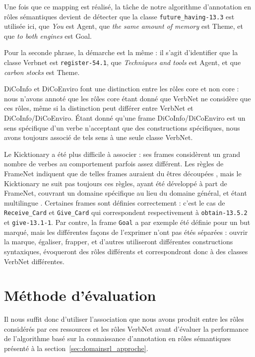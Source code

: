 Une fois que ce mapping est réalisé, la tâche de notre algorithme d'annotation
en rôles sémantiques devient de détecter que la classe \texttt{future\_having-13.3} est
utilisée ici, que \emph{You} est Agent, que \emph{the same amount of memory} est Theme,
et que \emph{to both engines} est Goal.

Pour la seconde phrase, la démarche est la même : il s'agit d'identifier que la
classe Verbnet est \texttt{register-54.1}, que \textit{Techniques and tools}
est Agent, et que \textit{carbon stocks} est Theme.

DiCoInfo et DiCoEnviro font une distinction entre les rôles core et non core :
nous n'avons annoté que les rôles core étant donné que VerbNet ne considère que
ces rôles, même si la distinction peut différer entre VerbNet et
DiCoInfo/DiCoEnviro. Étant donné qu'une frame DiCoInfo/DiCoEnviro est un sens
spécifique d'un verbe n'acceptant que des constructions spécifiques, nous avons
toujours associé de tels sens à une seule classe VerbNet.

Le Kicktionary a été plus difficile à associer : ses frames considèrent un
grand nombre de verbes au comportement parfois assez différent. Les règles de
FrameNet indiquent que de telles frames auraient du êtres découpées
\citep{ruppenhofer2006extended}, mais le Kicktionary ne suit pas toujours ces
règles, ayant été développé à part de FrameNet, couvrant un domaine spécifique
au lieu du domaine général, et étant multilingue
\citep{schmidt2006interfacing}. Certaines frames sont définies correctement :
c'est le cas de \texttt{Receive\_Card} et \texttt{Give\_Card} qui correspondent
respectivement à \texttt{obtain-13.5.2} et \texttt{give-13.1-1}. Par contre, la
frame \texttt{Goal} a par exemple été définie pour un but marqué, mais les
différentes façons de l'exprimer n'ont pas étés séparées : ouvrir la marque,
égaliser, frapper, et d'autres utiliseront différentes constructions
syntaxiques, évoqueront des rôles différents et correspondront donc à des
classes VerbNet différentes.

\section{Méthode d'évaluation}

Il nous suffit donc d'utiliser l'association que nous avons produit entre les
rôles considérés par ces ressources et les rôles VerbNet avant d'évaluer la
performance de l'algorithme basé sur la connaissance d'annotation en rôles
sémantiques présenté à la section~\ref{sec:domainsrl_approche}.

